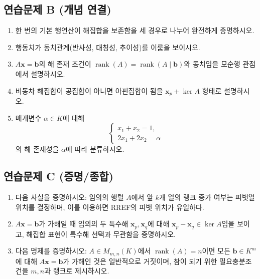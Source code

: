 \subsection*{연습문제 B (개념 연결)}
\begin{enumerate}[label=B-\arabic*.]
\item 한 번의 기본 행연산이 해집합을 보존함을 세 경우로 나누어 완전하게 증명하시오.
\item 행동치가 동치관계(반사성, 대칭성, 추이성)를 이룸을 보이시오.
\item $A\mathbf{x}=\mathbf{b}$의 해 존재 조건이 $\operatorname{rank}(A)=\operatorname{rank}(A\mid\mathbf{b})$와 동치임을 모순행 관점에서 설명하시오.
\item 비동차 해집합이 공집합이 아니면 아핀집합이 됨을 $\mathbf{x}_p+\ker A$ 형태로 설명하시오.
\item 매개변수 $\alpha\in K$에 대해
\[
\begin{cases}
x_1+x_2=1,\\
2x_1+2x_2=\alpha
\end{cases}
\]
의 해 존재성을 $\alpha$에 따라 분류하시오.
\end{enumerate}

\subsection*{연습문제 C (증명/종합)}
\begin{enumerate}[label=C-\arabic*.]
\item 다음 사실을 증명하시오: 임의의 행렬 $A$에서 앞 $k$개 열의 랭크 증가 여부는 피벗열 위치를 결정하며, 이를 이용하면 RREF의 피벗 위치가 유일하다.
\item $A\mathbf{x}=\mathbf{b}$가 가해일 때 임의의 두 특수해 $\mathbf{x}_p,\mathbf{x}_q$에 대해 $\mathbf{x}_p-\mathbf{x}_q\in\ker A$임을 보이고, 해집합 표현이 특수해 선택과 무관함을 증명하시오.
\item 다음 명제를 증명하시오: $A\in M_{m,n}(K)$에서 $\operatorname{rank}(A)=n$이면 모든 $\mathbf{b}\in K^m$에 대해 $A\mathbf{x}=\mathbf{b}$가 가해인 것은 일반적으로 거짓이며, 참이 되기 위한 필요충분조건을 $m,n$과 랭크로 제시하시오.
\end{enumerate}